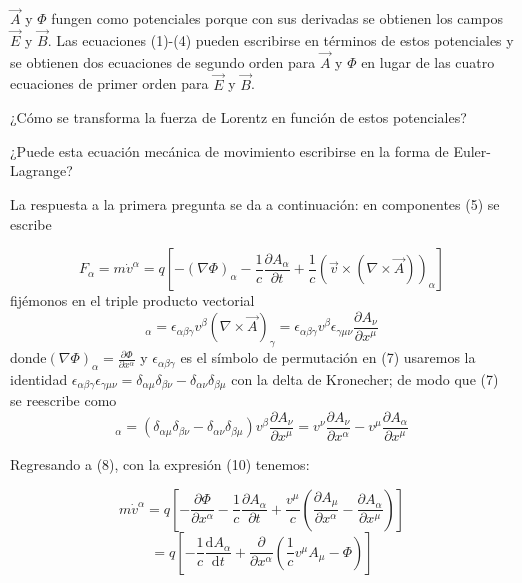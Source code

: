 \documentclass{article}
\begin{document}
$\vec A$ y $\Phi$ fungen como potenciales porque con sus derivadas se obtienen los campos $\vec E$ y $\vec B$. Las ecuaciones (1)-(4) pueden escribirse en términos de estos potenciales y se obtienen dos ecuaciones de segundo orden para $\vec A$ y $\Phi$ en lugar de las cuatro ecuaciones de primer orden para $\vec E$ y $\vec B$.

¿Cómo se transforma la fuerza de Lorentz en función de estos potenciales?

¿Puede esta ecuación mecánica de movimiento escribirse en la forma de Euler-Lagrange?

La respuesta a la primera pregunta se da a continuación: en componentes (5) se escribe

\begin{equation}
    F_{\alpha}=m\dot v ^{\alpha}=q[-(\nabla \Phi)_{\alpha} -\frac{1}{c}\frac{\partial A_{\alpha}}{\partial t} + \frac{1}{c}(\vec v \times (\nabla \times \vec A))_{\alpha}]
\end{equation}
fijémonos en el triple producto vectorial
\begin{equation}
    [\vec v \times (\nabla \times \vec A)]_{\alpha} = \epsilon_{\alpha \beta \gamma} v^{\beta} (\nabla \times \vec A)_{\gamma} = \epsilon_{\alpha \beta \gamma} v^{\beta} \epsilon_{\gamma \mu \nu} \frac{\partial A_{\nu}}{\partial x^{\mu}}
\end{equation} 
donde$(\nabla \Phi)_{\alpha}= \frac{\partial \Phi}{\partial x^{\alpha}} $ y $\epsilon_{\alpha \beta \gamma}$ es el símbolo de permutación en (7) usaremos la identidad $\epsilon_{\alpha\beta\gamma} \epsilon_{\gamma\mu\nu}= \delta_{\alpha\mu}\delta_{\beta\nu}-\delta_{\alpha\nu}\delta_{\beta\mu}$ con la delta de Kronecher; de modo que (7) se reescribe como
\begin{equation}
    [\vec v\times (\nabla\times\vec A) ]_{\alpha}=(\delta_{\alpha\mu}\delta_{\beta\nu}-\delta_{\alpha\nu}\delta_{\beta\mu})v^{\beta} \frac{\partial A_{\nu}}{\partial x^{\mu}}= v^{\nu} \frac{\partial A_{\nu}}{\partial x^{\alpha}}-v^{\mu} \frac{\partial A_{\alpha}}{\partial x^{\mu}}
\end{equation}

Regresando a (8), con la expresión (10) tenemos:

\begin{equation*}
	m\dot v^{\alpha}=q\left[-\frac{\partial \Phi}{\partial x^{\alpha}} -\frac{1}{c}\frac{\partial A_{\alpha}}{\partial t} + \frac{v^{\mu}}{c}\left(\frac{\partial A_{\mu}}{\partial x^{\alpha}} - \frac{\partial A_{\alpha}}{\partial x^{\mu}}\right) \right ]
\end{equation*}
\begin{equation}
= q \left[-\frac{1}{c}\frac{\mathrm{d} A_{\alpha}}{\mathrm{d} t} + \frac{\partial}{\partial x^{\alpha}}\left(\frac{1}{c}v^{\mu}A_{\mu} - \Phi \right )\right]
\end{equation}
\end{document}

